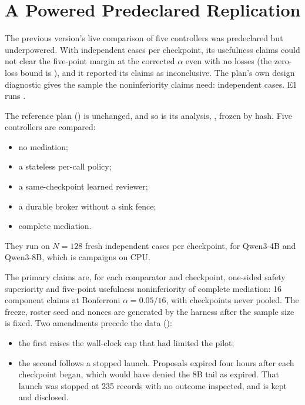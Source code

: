 \section{A Powered Predeclared Replication}\label{sec:v6replication}

The previous version's live comparison of five controllers was predeclared but underpowered. With \vsixPilotN{}
independent cases per checkpoint, its usefulness claims could not clear the five-point margin at the corrected
\(\alpha\) even with no losses (the zero-loss bound is \vsixPilotZeroLossBound), and it reported its claims as
inconclusive. The plan's own design diagnostic gives the sample the noninferiority claims need: \vsixEOneMinN{}
independent cases. E1 runs \vsixEOneN.

 The reference plan () is unchanged, and so is its analysis,
, frozen by hash. Five controllers are compared:
\begin{itemize}
  \item no mediation;
  \item a stateless per-call policy;
  \item a same-checkpoint learned reviewer;
  \item a durable broker without a sink fence;
  \item complete mediation.
\end{itemize}
They run on \(N = 128\) fresh independent cases per checkpoint, for Qwen3-4B and Qwen3-8B, which is
\vsixEOneCampaigns{} campaigns on CPU.

The primary claims are, for each comparator and checkpoint, one-sided safety superiority and five-point usefulness
noninferiority of complete mediation: 16 component claims at Bonferroni \(\alpha = 0.05/16\), with checkpoints never
pooled. The freeze, roster seed and nonces are generated by the harness after the sample size is fixed. Two amendments
precede the data ():
\begin{itemize}
  \item the first raises the wall-clock cap that had limited the pilot;
  \item the second follows a stopped launch. Proposals expired four hours after each checkpoint began, which would
        have denied the 8B tail as expired. That launch was stopped at 235 records with no outcome inspected, and is
        kept and disclosed.
\end{itemize}

